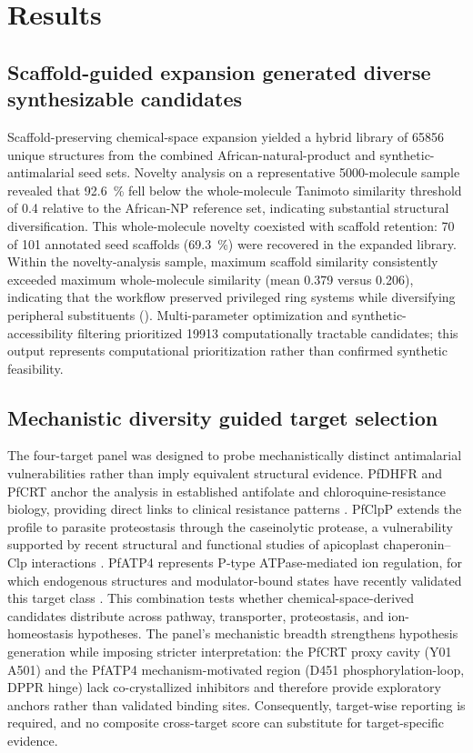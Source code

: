 \documentclass[journal=jcisd8,manuscript=article]{achemso}
\begin{document}
\section{Results}\label{sec:results}
\subsection{Scaffold-guided expansion generated diverse synthesizable candidates}\label{sec:results_scaffold}
Scaffold-preserving chemical-space expansion yielded a hybrid library of \num{65856} unique structures from the combined African-natural-product and synthetic-antimalarial seed sets. Novelty analysis on a representative \num{5000}-molecule sample revealed that \qty{92.6}{\percent} fell below the whole-molecule Tanimoto similarity threshold of \num{0.4} relative to the African-NP reference set, indicating substantial structural diversification. This whole-molecule novelty coexisted with scaffold retention: \num{70} of \num{101} annotated seed scaffolds (\qty{69.3}{\percent}) were recovered in the expanded library. Within the novelty-analysis sample, maximum scaffold similarity consistently exceeded maximum whole-molecule similarity (mean \num{0.379} versus \num{0.206}), indicating that the workflow preserved privileged ring systems while diversifying peripheral substituents (). Multi-parameter optimization and synthetic-accessibility filtering prioritized \num{19913} computationally tractable candidates; this output represents computational prioritization rather than confirmed synthetic feasibility.

\subsection{Mechanistic diversity guided target selection}\label{sec:results_mechanistic}
The four-target panel was designed to probe mechanistically distinct antimalarial vulnerabilities rather than imply equivalent structural evidence. PfDHFR and PfCRT anchor the analysis in established antifolate and chloroquine-resistance biology, providing direct links to clinical resistance patterns \cite{Fidock2000,Ariey2014}. PfClpP extends the profile to parasite proteostasis through the caseinolytic protease, a vulnerability supported by recent structural and functional studies of apicoplast chaperonin--Clp interactions \cite{Tissawak2025}. PfATP4 represents P-type ATPase-mediated ion regulation, for which endogenous structures and modulator-bound states have recently validated this target class \cite{Haile2025}. This combination tests whether chemical-space-derived candidates distribute across pathway, transporter, proteostasis, and ion-homeostasis hypotheses. The panel's mechanistic breadth strengthens hypothesis generation while imposing stricter interpretation: the PfCRT proxy cavity (Y01 A501) and the PfATP4 mechanism-motivated region (D451 phosphorylation-loop, DPPR hinge) lack co-crystallized inhibitors and therefore provide exploratory anchors rather than validated binding sites. Consequently, target-wise reporting is required, and no composite cross-target score can substitute for target-specific evidence.
\end{document}
